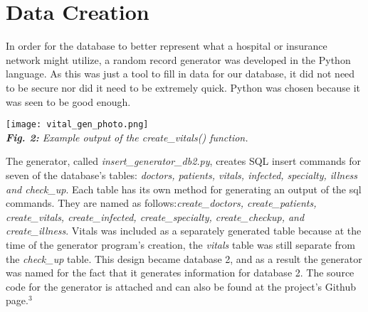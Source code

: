 \documentclass[12pt]{article}
\theoremstyle{plain}
\theoremstyle{definition}
\begin{document}
\section*{Data Creation}
In order for the database to better represent what a hospital or insurance network might utilize, a random record generator was developed in the Python language. As this was just a tool to fill in data for our database, it did not need to be secure nor did it need to be extremely quick. Python was chosen because it was seen to be good enough.
\\
\begin{center}
\texttt{[image: vital\_gen\_photo.png]}\\
\footnotesize{\textit{\textbf{Fig. 2:} Example output of the create\_vitals() function.}}
\end{center}
The generator, called \textit{insert\_generator\_db2.py}, creates SQL insert commands for seven of the database's tables: \textit{doctors, patients, vitals, infected, specialty, illness and check\_up}.  Each table has its own method for generating an output of the sql commands.  They are named as follows:\textit{create\_doctors, create\_patients, create\_vitals, create\_infected, create\_specialty, create\_checkup, and create\_illness}.  Vitals was included as a separately generated table because at the time of the generator program's creation, the \textit{vitals} table was still separate from the \textit{check\_up} table.  This design became database 2, and as a result the generator was named for the fact that it generates information for database 2.  The source code for the generator is attached and can also be found at the project's Github page.$^{3}$\\

\end{document}
